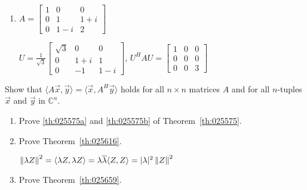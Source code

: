 \documentclass{ximera}
\begin{document}
\begin{problem}
\begin{enumerate}
\item $A = \left[ \begin{array}{ccc}
1 & 0 & 0\\
0 & 1 & 1 + i\\
0 & 1 - i & 2
\end{array}\right]$
\begin{hint}
$U = \frac{1}{\sqrt{3}}\left[ \begin{array}{ccc}
\sqrt{3} & 0 & 0 \\
0 & 1 + i & 1 \\
0 & -1 & 1 - i
\end{array}\right]$, $U^HAU = \left[ \begin{array}{rrr}
1 & 0 & 0 \\
0 & 0 & 0 \\
0 & 0 & 3
\end{array}\right]$
\end{hint}

\end{enumerate}
\end{problem}

\begin{problem}\label{prb:complex_matrices9}
Show that $\langle A \vec{x}, \vec{y} \rangle = \langle \vec{x}, A^{H}\vec{y}\rangle$ holds for all $n \times n$ matrices $A$ and for all $n$-tuples $\vec{x}$ and $\vec{y}$ in $\mathbb{C}^n$.
\end{problem}

\begin{problem}\label{prb:complex_matrices10}
\begin{enumerate}
\item Prove \ref{th:025575a} and \ref{th:025575b} of Theorem~\ref{th:025575}.

\item Prove Theorem~\ref{th:025616}.
\begin{hint}
$\left\lVert \lambda Z \right\rVert^2 = \langle \lambda Z, \lambda Z \rangle = \lambda\overline{\lambda} \langle Z, Z \rangle = |\lambda|^2 \left\lVert Z \right\rVert^2$
\end{hint}

\item Prove Theorem~\ref{th:025659}.

\end{enumerate}
\end{problem}
\end{document}
